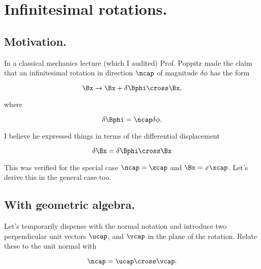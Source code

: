 
%

\chapter{Infinitesimal rotations.}
\label{chap:infinitesimalRotation}
{}
\date{Jan 27, 2012}

\beginArtWithToc

\section{Motivation.}

In a classical mechanics lecture (which I audited) Prof. Poppitz made the claim that an infinitesimal rotation in direction $\ncap$ of magnitude $\delta \phi$ has the form

\begin{equation}\label{eqn:continuumL6:10}
\Bx \rightarrow \Bx + \delta \Bphi \cross \Bx,
\end{equation}

where

\begin{equation}\label{eqn:continuumL6:30}
\delta \Bphi = \ncap \delta \phi.
\end{equation}

I believe he expressed things in terms of the differential displacement

\begin{equation}\label{eqn:continuumL6:50}
\delta \Bx = \delta \Bphi \cross \Bx
\end{equation}

This was verified for the special case $\ncap = \zcap$ and $\Bx = x \xcap$.  Let's derive this in the general case too.

\section{With geometric algebra.}

Let's temporarily dispense with the normal notation and introduce two perpendicular unit vectors $\ucap$, and $\vcap$ in the plane of the rotation.  Relate these to the unit normal with

\begin{equation}\label{eqn:continuumL6:70}
\ncap = \ucap \cross \vcap.
\end{equation}

